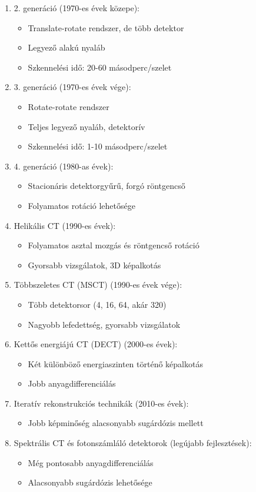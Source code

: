 \documentclass[a4paper,12pt]{article}
\begin{document}
\begin{enumerate}
\item 2. generáció (1970-es évek közepe): \begin{itemize} \item Translate-rotate rendszer, de több detektor \item Legyező alakú nyaláb \item Szkennelési idő: 20-60 másodperc/szelet \end{itemize} \item 3. generáció (1970-es évek vége): \begin{itemize} \item Rotate-rotate rendszer \item Teljes legyező nyaláb, detektorív \item Szkennelési idő: 1-10 másodperc/szelet \end{itemize} \item 4. generáció (1980-as évek): \begin{itemize} \item Stacionáris detektorgyűrű, forgó röntgencső \item Folyamatos rotáció lehetősége \end{itemize} \item Helikális CT (1990-es évek): \begin{itemize} \item Folyamatos asztal mozgás és röntgencső rotáció \item Gyorsabb vizsgálatok, 3D képalkotás \end{itemize} \item Többszeletes CT (MSCT) (1990-es évek vége): \begin{itemize} \item Több detektorsor (4, 16, 64, akár 320) \item Nagyobb lefedettség, gyorsabb vizsgálatok \end{itemize} \item Kettős energiájú CT (DECT) (2000-es évek): \begin{itemize} \item Két különböző energiaszinten történő képalkotás \item Jobb anyagdifferenciálás \end{itemize} \item Iteratív rekonstrukciós technikák (2010-es évek): \begin{itemize} \item Jobb képminőség alacsonyabb sugárdózis mellett \end{itemize} \item Spektrális CT és fotonszámláló detektorok (legújabb fejlesztések): \begin{itemize} \item Még pontosabb anyagdifferenciálás \item Alacsonyabb sugárdózis lehetősége \end{itemize}
\end{enumerate}
\end{document}
